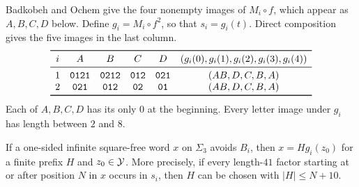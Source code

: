 Badkobeh and Ochem \cite[\S3.1]{BO} give the four nonempty
images of \(M_i\circ f\), which appear as \(A,B,C,D\) below.
Define \(g_i=M_i\circ f^2\), so that \(s_i=g_i(t)\).
Direct composition gives the five images in the last column.
\[
\begin{array}{c@{\quad}cccc@{\quad}c}
\toprule
i & A & B & C & D & (g_i(0),g_i(1),g_i(2),g_i(3),g_i(4))\\
\midrule
1 & \tern{0121} & \tern{0212} & \tern{012} & \tern{021} & (AB,D,C,B,A)\\
2 & \tern{021} & \tern{012} & \tern{02} & \tern{01} & (AB,D,C,B,A)\\
\bottomrule
\end{array}
\]
Each of \(A,B,C,D\) has its only \(0\) at the beginning.
Every letter image under \(g_i\) has length between \(2\) and \(8\).

\begin{lemma}\label{lem:ternary}
If a one-sided infinite square-free word \(x\) on \(\Sigma_3\)
avoids \(B_i\), then \(x=H g_i(z_0)\) for a finite prefix \(H\)
and \(z_0\in\mathcal Y\). More precisely, if every length-\(41\) factor
starting at or after position \(N\) in \(x\) occurs in \(s_i\),
then \(H\) can be chosen with \(|H|\le N+10\).
\end{lemma}

